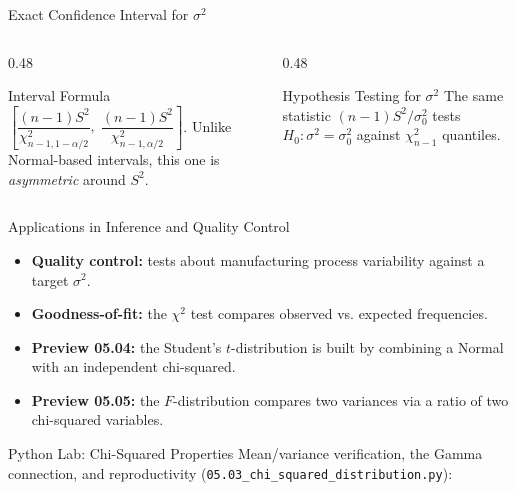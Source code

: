 \documentclass[aspectratio=169,xcolor={dvipsnames,table}]{beamer}
\begin{document}
\begin{frame}{Exact Confidence Interval for $\sigma^2$}
	\vspace{-0.15cm}
	\begin{columns}[T]
		\begin{column}{0.48\textwidth}
			\begin{block}{Interval Formula}
				\footnotesize
				$\left[\dfrac{(n-1)S^2}{\chi^2_{n-1,1-\alpha/2}},\; \dfrac{(n-1)S^2}{\chi^2_{n-1,\alpha/2}}\right]$. Unlike Normal-based intervals, this one is \emph{asymmetric} around $S^2$.
			\end{block}
		\end{column}
		\begin{column}{0.48\textwidth}
			\begin{alertblock}{Hypothesis Testing for $\sigma^2$}
				\footnotesize
				The same statistic $(n-1)S^2/\sigma_0^2$ tests $H_0:\sigma^2=\sigma_0^2$ against $\chi^2_{n-1}$ quantiles.
			\end{alertblock}
		\end{column}
	\end{columns}
\end{frame}

\begin{frame}{Applications in Inference and Quality Control}
	\vspace{-0.1cm}
	\begin{itemize}\itemsep=0.1cm
		\item \textbf{Quality control:} tests about manufacturing process variability against a target $\sigma^2$. \pause
		\item \textbf{Goodness-of-fit:} the $\chi^2$ test compares observed vs. expected frequencies. \pause
		\item \textbf{Preview 05.04:} the Student's $t$-distribution is built by combining a Normal with an independent chi-squared. \pause
		\item \textbf{Preview 05.05:} the $F$-distribution compares two variances via a ratio of two chi-squared variables.
	\end{itemize}
\end{frame}

\begin{frame}[fragile]{Python Lab: Chi-Squared Properties}
	\vspace{-0.05cm}
	\scriptsize
	Mean/variance verification, the Gamma connection, and reproductivity (\texttt{05.03\_chi\_squared\_distribution.py}):
	{
	}
\end{frame}
\end{document}
